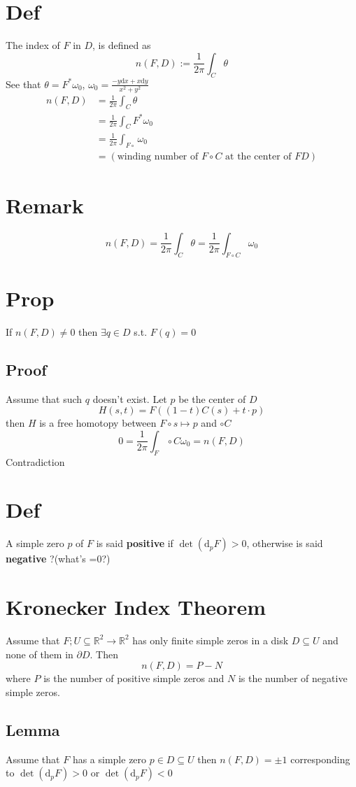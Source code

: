\documentclass{book}
\begin{document}
\section{Def} The index of $F$ in $D$, is defined as
$$n(F,D):=\frac{1}{2\pi}\int_C\theta$$
See that $\theta=F^*\omega_0$, $\omega_0=\frac{-y\text{d}x+x\text{d}y}{x^2+y^2}$
$$\begin{aligned}
    n(F,D)&=\frac{1}{2\pi}\int_C\theta\\
    &=\frac{1}{2\pi}\int_CF^*\omega_0\\
    &=\frac{1}{2\pi}\int_{F\circ}\omega_0\\
    &=(\text{winding number of }F\circ C\text{ at the center of }F D)
\end{aligned}$$ 
\section{Remark}
$$n(F,D)=\frac{1}{2\pi}\int_C\theta=\frac{1}{2\pi}\int_{F\circ C}\omega_0$$
\section{Prop}
If $n(F,D)\neq 0$ then $\exists q\in D$ s.t. $F(q)=0$
\subsection*{Proof}
Assume that such $q$ doesn't exist. Let $p$ be the center of $D$
$$H(s,t)=F((1-t)C(s)+t\cdot p)$$
then $H$ is a free homotopy between $F\circ s\mapsto p$ and $\circ C$
$$0=\frac{1}{2\pi}\int_F\circ C
\omega_0=n(F,D)$$
Contradiction
\section{Def}
A simple zero $p$ of $F$ is said \textbf{positive} if $\det(\text{d}_p F)>0$, otherwise is said \textbf{negative} ?(what's =0?)

\section{Kronecker Index Theorem}
Assume that $F;U\subseteq \mathbb{R}^2\rightarrow\mathbb{R}^2$ has only finite simple zeros in a disk $D\subseteq U$ and none of them in $\partial D$. Then
$$n(F,D)=P-N$$
where $P$ is the number of positive simple zeros and $N$ is the number of negative simple zeros.
\subsection*{Lemma}
Assume that $F$ has a simple zero $p\in D\subseteq U$ then $n(F,D)=\pm 1$ corresponding to $\det(\text{d}_p F)>0$ or $\det(\text{d}_p F)<0$
\end{document}
